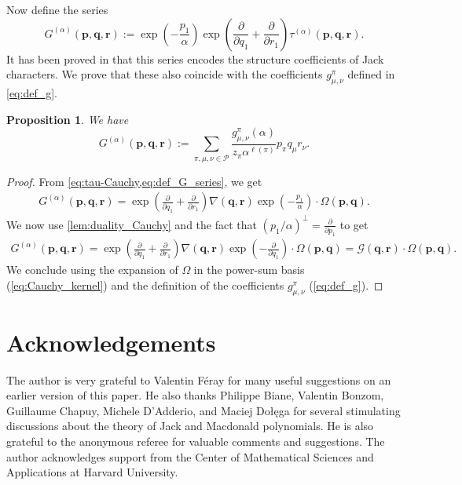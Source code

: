\documentclass[12pt]{amsart}
\newtheorem{prop}[thm]{Proposition}
\theoremstyle{remark}
\newcommand{\bfp}{\boldsymbol{p}}
\newcommand{\bfq}{\boldsymbol{q}}
\newcommand{\bfr}{\boldsymbol{r}}
\newcommand{\G}{\mathcal G}
\newcommand{\YY}{\mathcal{P}}
\begin{document}
Now define the series     
\begin{equation}\label{eq:def_G_series}
  G^{(\alpha)}(\bfp,\bfq,\bfr):=\exp\left(-\frac{p_1}{\alpha}\right)\exp\left(\frac{\partial}{\partial q_1}+\frac{\partial}{
  \partial r_1}\right)\tau^{(\alpha)}(\bfp,\bfq,\bfr).  
\end{equation}
It has been proved in \cite[Proposition 3.5]{BenDali2025} that this series encodes the structure coefficients of Jack characters. We prove that these also coincide with the coefficients $g^\pi_{\mu,\nu}$ defined in \cref{eq:def_g}.
\begin{prop}\label{prop:g}
    We have
\begin{equation}\label{eq:def_G}
  G^{(\alpha)}(\bfp,\bfq,\bfr):=\sum_{\pi,\mu,\nu\in\YY}\frac{g^\pi_{\mu,\nu}(\alpha)}{z_\pi \alpha^{\ell(\pi)}}p_\pi q_\mu r_\nu.  
\end{equation}

\end{prop}
\begin{proof}
    From  \cref{eq:tau-Cauchy,eq:def_G_series}, we get
\begin{align*}
  G^{(\alpha)}(\bfp,\bfq,\bfr)=\exp\left(\frac{\partial}{\partial q_1}+\frac{\partial}{
  \partial r_1}\right)\nabla(\bfq,\bfr)\exp\left(-\frac{p_1}{\alpha}\right)\cdot \Omega(\bfp,\bfq).  
\end{align*}
We now use \cref{lem:duality_Cauchy} and the fact that $(p_1/\alpha)^\perp=\frac{\partial}{\partial p_1}$ to get
\begin{align*}
  G^{(\alpha)}(\bfp,\bfq,\bfr)=\exp\left(\frac{\partial}{\partial q_1}+\frac{\partial}{
  \partial r_1}\right)\nabla(\bfq,\bfr)\exp\left(-\frac{\partial}{\partial q_1}\right)\cdot \Omega(\bfp,\bfq)=\G(\bfq,\bfr)\cdot \Omega(\bfp,\bfq).
\end{align*}
    We conclude using the expansion of $\Omega$ in the power-sum basis (\cref{eq:Cauchy_kernel}) and the definition of the coefficients $g^\pi_{\mu,\nu}$ (\cref{eq:def_g}).\end{proof}




\section*{Acknowledgements}
The author is very grateful to Valentin Féray for many useful suggestions on an earlier version of this paper. He also thanks Philippe Biane, Valentin Bonzom, Guillaume Chapuy, Michele D'Adderio, and Maciej Do\l{}e\k{}ga for several stimulating discussions about the theory of Jack and Macdonald polynomials. He is also grateful to the anonymous referee for valuable comments and suggestions. The author acknowledges support from the Center of Mathematical Sciences and Applications at Harvard University.
\end{document}
